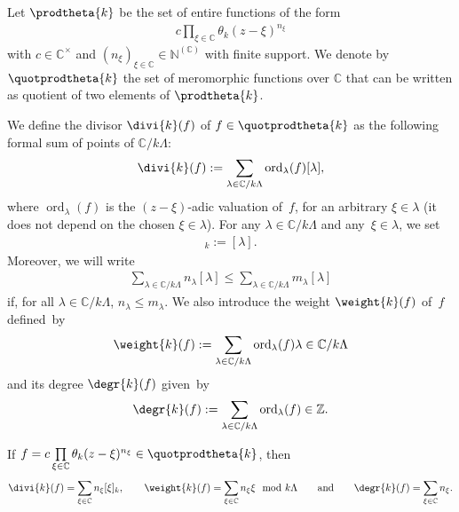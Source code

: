 \documentclass[pdftex]{sigma}
\numberwithin{equation}{section}
\begin{document}
Let $\prodtheta{k}$ be the set of entire functions of the form
\begin{gather*}
c  \prod\limits_{\xi \in \mathbb C} \theta_{k}(z-\xi)^{n_{\xi}}
\end{gather*}
with $c \in \mathbb C^{\times}$ and $(n_{\xi})_{\xi \in \mathbb C}\in \mathbb N^{(\mathbb C)}$ with f\/inite support.
We denote by $\quotprodtheta{k}$ the set of meromorphic functions over $\mathbb C$ that can be written as quotient of
two elements of $\prodtheta{k}$.

We def\/ine the divisor $\divi{k} (f)$ of $ f \in \quotprodtheta{k} $ as the following formal sum of points of $\mathbb
C/k\Lambda$:
\begin{gather*}
\divi{k} (f):= \sum\limits_{\lambda \in \mathbb C/k\Lambda} \operatorname{ord}_{\lambda}(f) [\lambda],
\end{gather*}
where $\operatorname{ord}_{\lambda}(f)$ is the $(z-\xi)$-adic valuation of~$f$, for an arbitrary $\xi \in \lambda$ (it
does not depend on the chosen $\xi \in \lambda$).
For any $\lambda \in \mathbb C/k\Lambda$ and any~$\xi \in \lambda$, we set
\begin{gather*}
[\xi]_k:=[\lambda].
\end{gather*}
Moreover, we will write
\begin{gather*}
\sum\limits_{\lambda \in \mathbb C/k\Lambda} n_{\lambda} [\lambda] \leq \sum\limits_{\lambda \in \mathbb C/k\Lambda}
m_{\lambda} [\lambda]
\end{gather*}
if, for all $\lambda \in \mathbb C/k\Lambda$, $n_{\lambda} \leq m_{\lambda}$.
We also introduce the weight $\weight{k} (f)$ of~$f$ def\/ined~by
\begin{gather*}
\weight{k}(f):=\sum\limits_{\lambda \in \mathbb C/k\Lambda} \operatorname{ord}_{\lambda}(f) \lambda \in \mathbb
C/k\Lambda
\end{gather*}
and its degree $\degr{k} (f)$ given~by
\begin{gather*}
\degr{k} (f):=\sum\limits_{\lambda \in \mathbb C/k\Lambda} \operatorname{ord}_{\lambda}(f) \in \mathbb Z.
\end{gather*}

If $f= c  \prod\limits_{\xi \in \mathbb C} \theta_{k}(z-\xi)^{n_{\xi}} \in \quotprodtheta{k}$, then
\begin{gather*}
\divi{k} (f) = \sum\limits_{\xi \in \mathbb C} n_{\xi} [\xi]_{k},
\qquad
\weight{k}(f) = \sum\limits_{\xi \in \mathbb C} n_\xi \xi \mod k\Lambda
\qquad {\rm and} \qquad
\degr{k} (f)=\sum\limits_{\xi \in \mathbb C} n_\xi.
\end{gather*}
\end{document}
